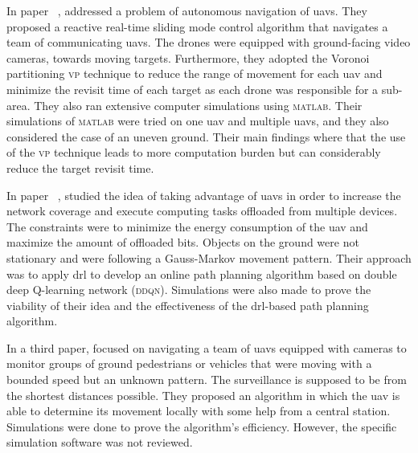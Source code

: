 \documentclass[../main.tex]{subfiles}
\begin{document}
In paper ~\cite{hua20}, \citeauthor{hua20} 
addressed a problem of autonomous navigation of \glspl{uav}. 
They proposed a reactive real-time sliding mode control algorithm 
that navigates a team of communicating \glspl{uav}.
The drones were equipped with ground-facing video cameras,
towards moving targets. 
Furthermore, they adopted the Voronoi partitioning \textsc{vp} technique 
to reduce the range of movement for each \gls{uav} and 
minimize the revisit time of each target as each drone was responsible 
for a sub-area.
They also ran extensive computer simulations using \textsc{matlab}. 
Their simulations of \textsc{matlab} were tried on one \gls{uav} and multiple \glspl{uav},
and they also considered the case of an uneven ground. 
Their main findings where that the use of the \textsc{vp} technique 
leads to more computation burden but can considerably reduce the target 
revisit time.


In paper ~\cite{pen21}, \citeauthor{pen21} studied the idea 
of taking advantage of \glspl{uav} in order to increase the network
coverage and execute computing tasks offloaded from multiple devices. 
The constraints were to minimize the energy consumption of the \gls{uav} 
and maximize the amount of offloaded bits. 
Objects on the ground were not stationary and were following a Gauss-Markov 
movement pattern. Their approach was to apply \gls{drl} to develop an online path planning algorithm based on double deep Q-learning network (\textsc{ddqn}).
Simulations were also made to prove the viability of their idea and the 
effectiveness of the \gls{drl}-based path planning algorithm.

In a third paper, \citeauthor{hua21} focused on navigating a team
of \glspl{uav} equipped with cameras to monitor groups of ground 
pedestrians or vehicles that were moving with a bounded speed but an unknown pattern. 
The surveillance is supposed to be from the shortest distances possible. 
They proposed an algorithm in which the \gls{uav} is able to determine 
its movement locally with some help from a central station.
Simulations were done to prove the algorithm's efficiency. However, the 
specific simulation software was not reviewed. 

\end{document}
